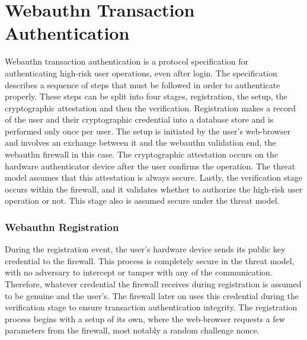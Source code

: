 \chapter{Webauthn Transaction Authentication}\label{Chap:WebauthnTransactionAuthentication}


Webauthn transaction authentication is a protocol specification for authenticating high-risk user operations, even after login. The specification describes a sequence of steps that must be followed in order to authenticate properly. These steps can be split into four stages, registration, the setup, the cryptographic attestation and then the verification. Registration makes a record of the user and their cryptographic credential into a database store and is performed only once per user. The setup is initiated by the user's web-browser and involves an exchange between it and the webauthn validation end, the webauthn firewall in this case. The cryptographic attestation occurs on the hardware authenticator device after the user confirms the operation. The threat model assumes that this attestation is always secure. Lastly, the verification stage occurs within the firewall, and it validates whether to authorize the high-risk user operation or not. This stage also is assumed secure under the threat model.


\subsection{Webauthn Registration}

During the registration event, the user's hardware device sends its public key credential to the firewall. This process is completely secure in the threat model, with no adversary to intercept or tamper with any of the communication. Therefore, whatever credential the firewall receives during registration is assumed to be genuine and the user's. The firewall later on uses this credential during the verification stage to ensure transaction authentication integrity. The registration process begins with a setup of its own, where the web-browser requests a few parameters from the firewall, most notably a random challenge nonce.

